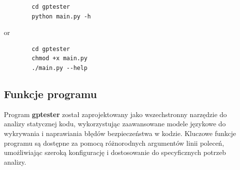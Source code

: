\begin{listing}
    \begin{verbatim}
        cd gptester
        python main.py -h
    \end{verbatim}
\end{listing}
or 
\begin{listing}
    \begin{verbatim}
        cd gptester
        chmod +x main.py
        ./main.py --help
    \end{verbatim}
\end{listing}



\subsection{Funkcje programu}

Program \textbf{gptester} został zaprojektowany jako wszechstronny narzędzie do analizy statycznej kodu, wykorzystując zaawansowane modele językowe do wykrywania i naprawiania błędów bezpieczeństwa w kodzie. Kluczowe funkcje programu są dostępne za pomocą różnorodnych argumentów linii poleceń, umożliwiając szeroką konfigurację i dostosowanie do specyficznych potrzeb analizy.

